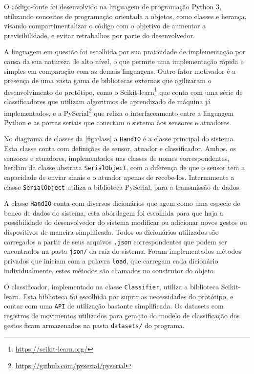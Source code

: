 O código-fonte foi desenvolvido na linguagem de programação Python $3$, utilizando conceitos de programação orientada a objetos, como classes e herança, visando compartimentalizar o código com o objetivo de aumentar a previsibilidade, e evitar retrabalhos por parte do desenvolvedor. 

A linguagem em questão foi escolhida por sua praticidade de implementação por causa da sua natureza de alto nível, o que permite uma implementação rápida e simples em comparação com as demais linguagens. Outro fator motivador é a presença de uma vasta gama de bibliotecas externas que agilizaram o desenvolvimento do protótipo, como o Scikit-learn\footnote{\url{https://scikit-learn.org/}\label{ftnote:sklearn}}
que conta com uma série de classificadores que utilizam algoritmos de aprendizado de máquina já implementados, e a PySerial\footnote{\url{https://github.com/pyserial/pyserial}\label{ftnote:pyserial}} que reliza o interfaceamento entre a linguagem Python e as portas seriais que conectam o sistema àos sensores e atuadores.

No diagrama de classes da \autoref{fig:class} a \texttt{HandIO} é a classe principal do sistema. Esta classe conta com definições de sensor, atuador e classificador. Ambos, os sensores e atuadores, implementados nas classes de nomes correspondentes, herdam da classe abstrata \texttt{SerialObject}, com a diferença de que o sensor tem a capacidade de enviar sinais e o atuador apenas de recebe-los. Internamente a classe \texttt{SerialObject} utiliza a biblioteca PySerial, para a transmissão de dados. 

A classe \texttt{HandIO} conta com diversos dicionários que agem como uma especie de banco de dados do sistema, esta abordagem foi escolhida para que haja a possibilidade do desenvolvedor do sistema modificar ou adicionar novos gestos ou dispositivos de maneira simplificada. Todos os dicionários utilizados são carregados a partir de seus arquivos \texttt{.json} correspondentes que podem ser encontrados na pasta \texttt{json/} da raiz do sistema. Foram implementados métodos privados que iniciam com a palavra \texttt{load}, que carregam cada dicionário individualmente, estes métodos são chamados no construtor do objeto.

O classificador, implementado na classe \texttt{Classifier}, utiliza a biblioteca Scikit-learn. Esta biblioteca foi escolhida por suprir as necessidades do protótipo, e contar com uma \texttt{API} de utilização bastante simplificada. Os datasets com registros de movimentos utilizados para geração do modelo de classificação dos gestos ficam armazenados na pasta \texttt{datasets/} do programa. 

